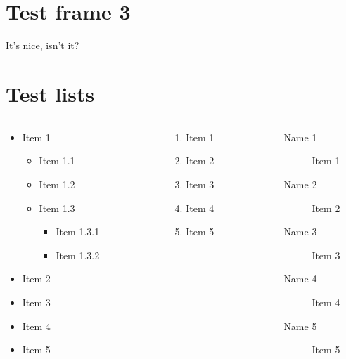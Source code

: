 \documentclass[%
    listings={
        Lean=listings-lean,
        Go
    },
	withappendix,
]{rainbow-beamer}
\begin{document}
\section{Test frame 3}
\begin{sframe}
	It's nice, isn't it?
\end{sframe}

\section{Test lists}
\begin{sframe}
	\begin{columns}
		\begin{column}{.32\linewidth}
			\begin{itemize}
				\item Item 1
				      \begin{itemize}
					      \item Item 1.1
					      \item Item 1.2
					      \item Item 1.3
					            \begin{itemize}
						            \item Item 1.3.1
						            \item Item 1.3.2
					            \end{itemize}
				      \end{itemize}
				\item Item 2
				\item Item 3
				\item Item 4
				\item Item 5
			\end{itemize}
		\end{column}
		\begin{column}{.05\linewidth}
			\centering
			\rule{.1mm}{.7\textheight}
		\end{column}
		\begin{column}{.24\linewidth}
			\begin{enumerate}
				\item Item 1
				\item Item 2
				\item Item 3
				\item Item 4
				\item Item 5
			\end{enumerate}
		\end{column}
		\begin{column}{.05\linewidth}
			\centering
			\rule{.1mm}{.7\textheight}
		\end{column}
		\begin{column}{.3\linewidth}
			\begin{description}
				\item[Name 1] Item 1
				\item[Name 2] Item 2
				\item[Name 3] Item 3
				\item[Name 4] Item 4
				\item[Name 5] Item 5
			\end{description}
		\end{column}
	\end{columns}
\end{sframe}
\end{document}
